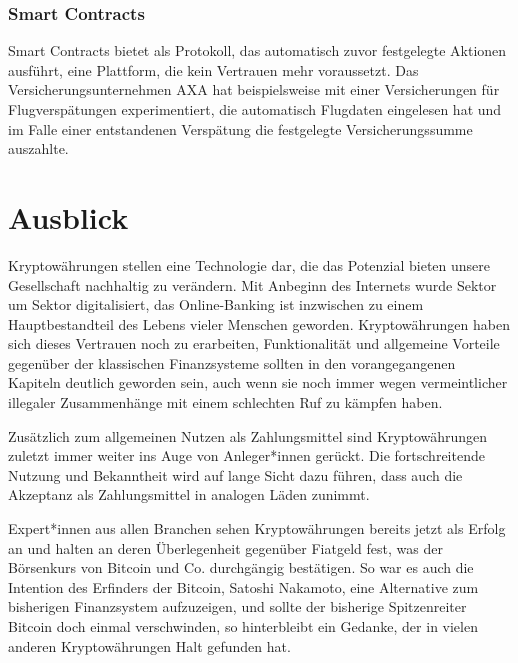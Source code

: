 \documentclass[12pt,oneside]{article}
\begin{document}
\subsubsection{Smart Contracts}

Smart Contracts bietet als Protokoll, das automatisch zuvor festgelegte Aktionen ausführt, eine Plattform, die kein Vertrauen mehr voraussetzt. Das Versicherungsunternehmen AXA hat beispielsweise mit einer Versicherungen für Flugverspätungen experimentiert, die automatisch Flugdaten eingelesen hat und im Falle einer entstandenen Verspätung die festgelegte Versicherungssumme auszahlte. \citep{hmd2019}

\newpage
\section{Ausblick}

Kryptowährungen stellen eine Technologie dar, die das Potenzial bieten unsere Gesellschaft nachhaltig zu verändern. Mit Anbeginn des Internets wurde Sektor um Sektor digitalisiert, das Online-Banking ist inzwischen zu einem Hauptbestandteil des Lebens vieler Menschen geworden. Kryptowährungen haben sich dieses Vertrauen noch zu erarbeiten, Funktionalität und allgemeine Vorteile gegenüber der klassischen Finanzsysteme sollten in den vorangegangenen Kapiteln deutlich geworden sein, auch wenn sie noch immer wegen vermeintlicher illegaler Zusammenhänge mit einem schlechten Ruf zu kämpfen haben.

Zusätzlich zum allgemeinen Nutzen als Zahlungsmittel sind Kryptowährungen zuletzt immer weiter ins Auge von Anleger*innen gerückt. Die fortschreitende Nutzung und Bekanntheit wird auf lange Sicht dazu führen, dass auch die Akzeptanz als Zahlungsmittel in analogen Läden zunimmt.

Expert*innen aus allen Branchen sehen Kryptowährungen bereits jetzt als Erfolg an und halten an deren Überlegenheit gegenüber Fiatgeld fest, was der Börsenkurs von Bitcoin und Co. durchgängig bestätigen. So war es auch die Intention des Erfinders der Bitcoin, Satoshi Nakamoto, eine Alternative zum bisherigen Finanzsystem aufzuzeigen, und sollte der bisherige Spitzenreiter Bitcoin doch einmal verschwinden, so hinterbleibt ein Gedanke, der in vielen anderen Kryptowährungen Halt gefunden hat.
\clearpage
\lhead{}
\printbibliography
{}



\end{document}
